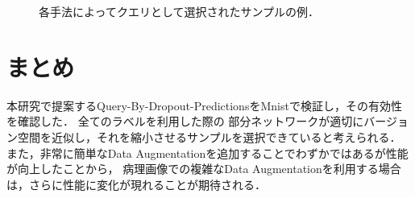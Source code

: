 \begin{figure}[hbp]
    \begin{center}
        \vspace{0.5cm}
    \caption{\label{figure:mnist_query_examples}各手法によってクエリとして選択されたサンプルの例．}
    \end{center}
\end{figure}

\section{まとめ}
本研究で提案するQuery-By-Dropout-PredictionsをMnistで検証し，その有効性を確認した．
全てのラベルを利用した際の
部分ネットワークが適切にバージョン空間を近似し，それを縮小させるサンプルを選択できていると考えられる．
また，非常に簡単なData Augmentationを追加することでわずかではあるが性能が向上したことから，
病理画像での複雑なData Augmentationを利用する場合は，さらに性能に変化が現れることが期待される．
